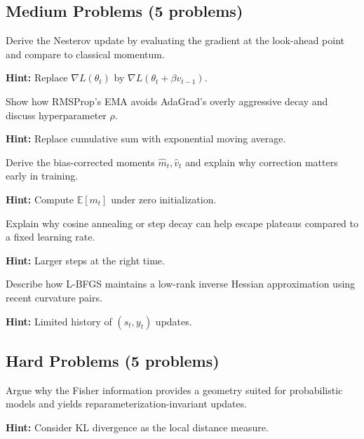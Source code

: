 \subsection{Medium Problems (5 problems)}

\begin{problem}
Derive the Nesterov update by evaluating the gradient at the look-ahead point and compare to classical momentum.

\textbf{Hint:} Replace $\nabla L(\theta_t)$ by $\nabla L(\theta_t+\beta v_{t-1})$.
\end{problem}

\begin{problem}
Show how RMSProp's EMA avoids AdaGrad's overly aggressive decay and discuss hyperparameter $\rho$.

\textbf{Hint:} Replace cumulative sum with exponential moving average.
\end{problem}

\begin{problem}
Derive the bias-corrected moments $\hat m_t, \hat v_t$ and explain why correction matters early in training.

\textbf{Hint:} Compute $\mathbb{E}[m_t]$ under zero initialization.
\end{problem}

\begin{problem}
Explain why cosine annealing or step decay can help escape plateaus compared to a fixed learning rate.

\textbf{Hint:} Larger steps at the right time.
\end{problem}

\begin{problem}
Describe how L-BFGS maintains a low-rank inverse Hessian approximation using recent curvature pairs.

\textbf{Hint:} Limited history of $(s_t, y_t)$ updates.
\end{problem}

\subsection{Hard Problems (5 problems)}

\begin{problem}
Argue why the Fisher information provides a geometry suited for probabilistic models and yields reparameterization-invariant updates.

\textbf{Hint:} Consider KL divergence as the local distance measure.
\end{problem}

